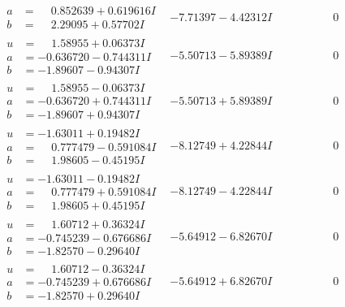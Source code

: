\documentclass[1p]{elsarticle_modified}
\theoremstyle{definition}
\begin{document}
$$\begin{array}{c|c|c}
\begin{aligned}
a &= \phantom{-}0.852639 + 0.619616 I \\
b &= \phantom{-}2.29095 + 0.57702 I\end{aligned}
 & -7.71397 - 4.42312 I & \phantom{-0.000000 } 0 \\ \hline\begin{aligned}
u &= \phantom{-}1.58955 + 0.06373 I \\
a &= -0.636720 - 0.744311 I \\
b &= -1.89607 - 0.94307 I\end{aligned}
 & -5.50713 - 5.89389 I & \phantom{-0.000000 } 0 \\ \hline\begin{aligned}
u &= \phantom{-}1.58955 - 0.06373 I \\
a &= -0.636720 + 0.744311 I \\
b &= -1.89607 + 0.94307 I\end{aligned}
 & -5.50713 + 5.89389 I & \phantom{-0.000000 } 0 \\ \hline\begin{aligned}
u &= -1.63011 + 0.19482 I \\
a &= \phantom{-}0.777479 - 0.591084 I \\
b &= \phantom{-}1.98605 - 0.45195 I\end{aligned}
 & -8.12749 + 4.22844 I & \phantom{-0.000000 } 0 \\ \hline\begin{aligned}
u &= -1.63011 - 0.19482 I \\
a &= \phantom{-}0.777479 + 0.591084 I \\
b &= \phantom{-}1.98605 + 0.45195 I\end{aligned}
 & -8.12749 - 4.22844 I & \phantom{-0.000000 } 0 \\ \hline\begin{aligned}
u &= \phantom{-}1.60712 + 0.36324 I \\
a &= -0.745239 - 0.676686 I \\
b &= -1.82570 - 0.29640 I\end{aligned}
 & -5.64912 - 6.82670 I & \phantom{-0.000000 } 0 \\ \hline\begin{aligned}
u &= \phantom{-}1.60712 - 0.36324 I \\
a &= -0.745239 + 0.676686 I \\
b &= -1.82570 + 0.29640 I\end{aligned}
 & -5.64912 + 6.82670 I & \phantom{-0.000000 } 0 \\ \hline\begin{aligned}

\end{aligned}
\end{array}$$
\end{document}
